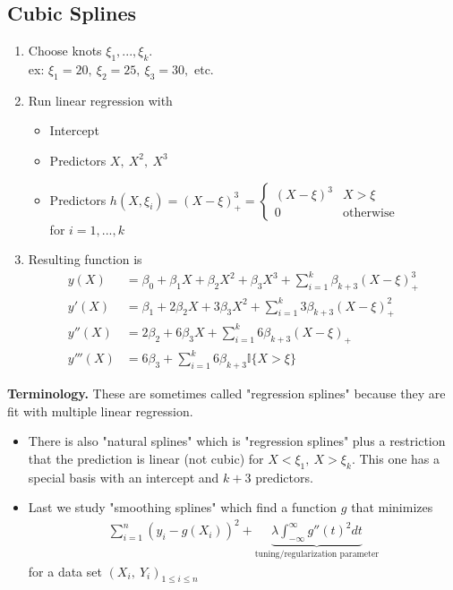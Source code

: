 \documentclass[12pt, letterpaper]{article}
\begin{document}
\subsection{Cubic Splines}
\begin{enumerate}
    \item Choose knots $\xi_1, ..., \xi_k$. \\
    ex: $\xi_1 = 20,\ \xi_2 = 25,\ \xi_3 = 30,$ etc.
    \item Run linear regression with \begin{itemize}
        \item Intercept
        \item Predictors $X,\ X^2,\ X^3$
        \item Predictors $h(X, \xi_i) = (X-\xi)^3_+ = \begin{cases}
            (X-\xi)^3 & X > \xi \\ 0 & \text{otherwise}
        \end{cases}$ \\
        for $i = 1,...,k$
    \end{itemize}
    \item Resulting function is
    \begin{align*}
        y(X) &= \beta_0 + \beta_1X + \beta_2X^2+\beta_3X^3+\sum_{i=1}^{k}\beta_{k+3}(X-\xi)^3_+ \\
        y'(X) &= \beta_1 + 2\beta_2X+ 3\beta_3X^2 + \sum_{i=1}^{k}3\beta_{k+3}(X-\xi)^2_+ \\
        y''(X) &= 2\beta_2 + 6\beta_3X + \sum_{i=1}^{k}6\beta_{k+3}(X-\xi)_+ \\
        y'''(X) &= 6\beta_3 + \sum_{i=1}^{k}6\beta_{k+3}\mathbb{I}\{X>\xi\}
    \end{align*}
\end{enumerate}
\textbf{Terminology.} These are sometimes called "regression splines" because they are fit 
with multiple linear regression.
\begin{itemize}
    \item There is also "natural splines" which is "regression splines" plus a restriction 
    that the prediction is linear (not cubic) for $X<\xi_1,\ X>\xi_k$. This one has a special
    basis with an intercept and $k+3$ predictors.
    \item Last we study "smoothing splines" which find a function $g$ that minimizes
    \begin{align*}
        \sum_{i=1}^{n}(y_i-g(X_i))^2 + \underbrace{\lambda\int_{-\infty}^{\infty}g''(t)^2dt}_{\text{tuning/regularization parameter}} 
    \end{align*}
    for a data set $(X_i,\ Y_i)_{1\le i\le n}$
\end{itemize}
\end{document}
